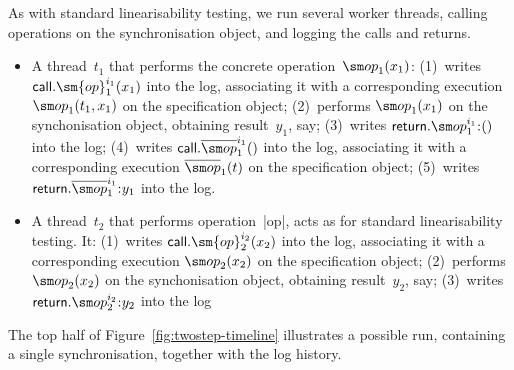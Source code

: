 As with standard linearisability testing, we run several worker threads,
calling operations on the synchronisation object, and logging the calls and
returns.
%
\begin{itemize}
\item A thread~$t_1$ that performs the concrete operation~$\op_1(x_1)$:
  (1)~writes $\call.\sm{op}_1^{i_1}(x_1)$ into the log, associating it with a
  corresponding execution $\op_1(t_1, x_1)$ on the specification object;
  (2)~performs $\op_1(x_1)$ on the synchonisation object, obtaining
  result~$y_1$, say; (3)~writes $\return.\op_1^{i_1} \:: ()$ into the log;
  (4)~writes $\call.\overline{\op}_1^{i_1}()$ into the log, associating it
  with a corresponding execution $\overline{\op}_1(t)$ on the specification
  object; (5)~writes $\return.\overline{\op}_1^{i_1} \:: y_1$ into the log.

\item A thread~$t_2$ that performs operation~|op|, acts as for standard
  linearisability testing.  It: (1)~writes $\call.\sm{op}_2^{i_2}(x_2)$ into
  the log, associating it with a corresponding execution $\op_2(x_2)$ on the
  specification object; (2)~performs $\op_2(x_2)$ on the synchonisation
  object, obtaining result~$y_2$, say; (3)~writes $\return.\op_2^{i_2} \::
  y_2$ into the log
\end{itemize}
%
The top half of Figure~\ref{fig:twostep-timeline} illustrates a possible run,
containing a single synchronisation, together with the log history.

